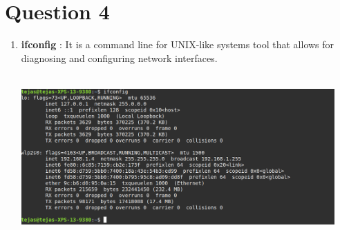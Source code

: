 \documentclass[a4paper,11pt]{article}
\begin{document}
\section*{Question 4}
\begin{enumerate}[itemsep=-3pt,label=(\alph*)]
	\item \textbf{ifconfig} : It is a command line for UNIX-like systems tool that allows for diagnosing and configuring network interfaces.
	\\
	\\ \includegraphics[height=60mm,width=120mm]{config}
	

\end{enumerate}
\end{document}
